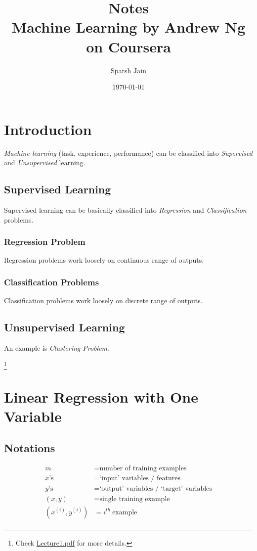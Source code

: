 \documentclass[a4paper, 12pt]{report}
\title{Notes\\
\large Machine Learning by Andrew Ng on Coursera}
\author{Sparsh Jain}
\date{\today}
\newcommand\blfootnote[1]{
	\begingroup
	\renewcommand\thefootnote{}\footnote{#1}
	\addtocounter{footnote}{-1}
	\endgroup
}
\begin{document}
\maketitle
\tableofcontents

\chapter{Introduction}
\emph{Machine learning} (task, experience, performance) can be classified into
\emph{Supervised} and \emph{Unsupervised} learning.

\section{Supervised Learning}
Supervised learning can be basically classified into \emph{Regression} and
\emph{Classification} problems.

\subsection{Regression Problem}
Regression problems work loosely on continuous range of outputs.

\subsection{Classification Problems}
Classification problems work loosely on discrete range of outputs.

\section{Unsupervised Learning}
An example is \emph{Clustering Problem}.

\blfootnote{Check \href{lecture_pdf/Lecture1.pdf}{Lecture1.pdf} for more details.}

\chapter{Linear Regression with One Variable}

\section{Notations}
\begin{align*}
	m                  & = \text{number of training examples}             \\
	x\text{'s}         & = \text{`input' variables / features}            \\
	y\text{'s}         & = \text{`output' variables / `target' variables} \\
	(x, y)             & = \text{single training example}                 \\
	(x^{(i)}, y^{(i)}) & = i^{th} \  \text{example}                       \\
\end{align*}
\end{document}
